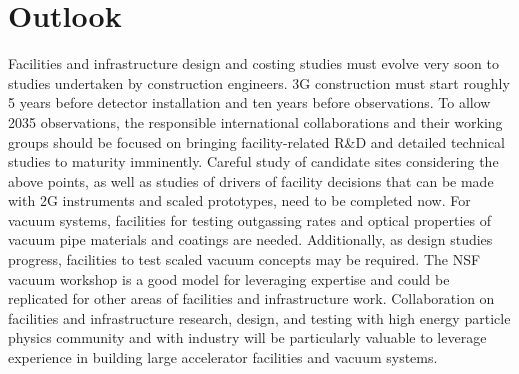 \section{Outlook}
Facilities and infrastructure design and costing studies must evolve very soon to studies undertaken by construction engineers. 
3G construction must start roughly 5 years before detector installation and ten years before observations. 
To allow 2035 observations, the responsible international collaborations and their working groups should be focused on bringing facility-related R\&D and detailed technical studies to maturity imminently.
Careful study of candidate sites considering the above points, as well as studies of drivers of facility decisions that can be made with 2G instruments and scaled prototypes, need to be completed now. 
For vacuum systems, facilities for testing outgassing rates and optical properties of vacuum pipe materials and coatings are needed. Additionally, as design studies progress, facilities to test scaled vacuum concepts may be required.
The NSF vacuum workshop is a good model for leveraging expertise and could be replicated for other areas of facilities and infrastructure work.
Collaboration on facilities and infrastructure research, design, and testing with high energy particle physics community and with industry will be particularly valuable to leverage experience in building large accelerator facilities and vacuum systems.


